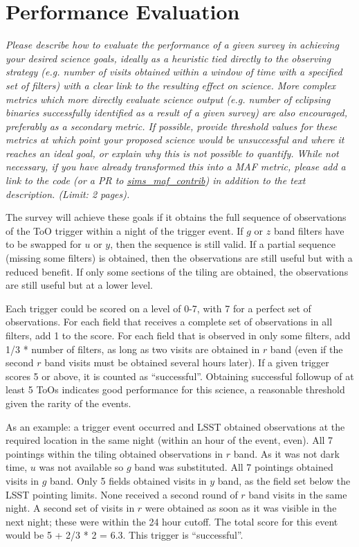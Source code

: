 \documentclass[12pt, letterpaper]{article}
\begin{document}
\section{Performance Evaluation}
\begin{footnotesize}
{\it Please describe how to evaluate the performance of a given survey in achieving your desired
science goals, ideally as a heuristic tied directly to the observing strategy (e.g. number of visits obtained
within a window of time with a specified set of filters) with a clear link to the resulting effect on science.
More complex metrics which more directly evaluate science output (e.g. number of eclipsing binaries successfully
identified as a result of a given survey) are also encouraged, preferably as a secondary metric.
If possible, provide threshold values for these metrics at which point your proposed science would be unsuccessful 
and where it reaches an ideal goal, or explain why this is not possible to quantify. While not necessary, 
if you have already transformed this into a MAF metric, please add a link to the code (or a PR to 
\href{https://github.com/lsst-nonproject/sims_maf_contrib}{sims\_maf\_contrib}) in addition to the text description. (Limit: 2 pages).}
\end{footnotesize}

The survey will achieve these goals if it obtains the full sequence of observations of the ToO trigger within a night of the trigger event. If $g$ or $z$ band filters 
have to be swapped for $u$ or $y$, then the sequence is still valid. If a partial sequence (missing some filters) is obtained, then the observations are still useful 
but with a reduced benefit. If only some sections of the tiling are obtained, the observations are still useful but at a lower level. 

Each trigger could be scored on a level of 0-7, with 7 for a perfect set of observations. For each field that receives a complete set of observations in all filters, add 1 to
the score. For each field that is observed in only some filters, add 1/3 * number of filters, as long as two visits are obtained in $r$ band (even if the second
$r$ band visits must be obtained several hours later). If a given trigger scores 5 or above, it is counted as ``successful''. Obtaining 
successful followup of at least 5 ToOs indicates good performance for this science, a reasonable threshold given the rarity of the events.

As an example: a trigger event occurred and LSST obtained observations at the required location in the same night (within an hour of the event, even). All 7 pointings 
within the tiling obtained observations in $r$ band. As it was not dark time, $u$ was not available so $g$ band was substituted. All 7 pointings obtained visits in $g$ 
band. Only 5 fields obtained visits in $y$ band, as the field set below the LSST pointing limits. None received a second round of $r$ band visits in the same night.
A second set of visits in $r$ were obtained as soon as it was visible in the next night; these were within the 24 hour cutoff. 
The total score for this event would be 5 + 2/3 * 2 = 6.3. This trigger is ``successful''.  
\end{document}
